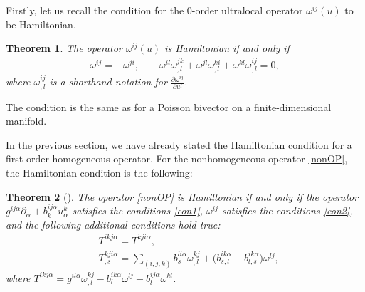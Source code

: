 \documentclass[10pt,a4paper]{amsart}
\numberwithin{equation}{section}
\newtheorem{Theorem}{Theorem}[section]
\begin{document}
Firstly, let us recall the condition for the 0-order ultralocal operator $\omega^{ij}(u)$ to be Hamiltonian.
\begin{Theorem}
The operator $\omega^{ij}(u)$ is Hamiltonian if and only if
\begin{gather}
\omega^{ij}=-\omega^{ji},\qquad
\omega^{il}\omega^{jk}_{,l}+\omega^{jl}\omega^{ki}_{,l}+\omega^{kl}\omega^{ij}_{,l}=0,\label{con2}
\end{gather}
where $\omega^{ij}_{,l}$ is a shorthand notation for $\frac{\partial \omega^{ij}}{\partial u^l}$.
\end{Theorem}
\begin{Remark}
The condition is the same as for a Poisson bivector on a finite-dimensional mani\-fold.
\end{Remark}

In the previous section, we have already stated the Hamiltonian condition for a first-order homogeneous operator. For the nonhomogeneous operator \eqref{nonOP}, the Hamiltonian condition is the following:
\begin{Theorem}[\cite{mokhov1995symplectic}]\label{theor5}
The operator \eqref{nonOP} is Hamiltonian if and only if the operator $g^{ij\alpha}\partial_\alpha+b^{ij\alpha}_ku^k_\alpha$ satisfies the conditions \eqref{con1}, $\omega^{ij}$ satisfies the conditions \eqref{con2}, and the following additional conditions hold true:
\begin{subequations}\label{con3}
\begin{align}
&T^{ikj\alpha} =T^{kji\alpha},\label{con3-1} \\
&T_{,s}^{kji\alpha} =\sum_{(i,j,k)}b_{s}^{li\alpha}\omega_{,l}^{kj}+\big(b_{s,l}^{ik\alpha}-b_{l,s}^{ik\alpha}\big)\omega^{lj}\label{con3-2},
\end{align}
\end{subequations}
where $T^{ikj\alpha}=g^{il\alpha}\omega^{kj}_{,l}-b^{ik\alpha}_l\omega^{lj}-b^{ij\alpha}_l\omega^{kl}$.
\end{Theorem}
\end{document}
